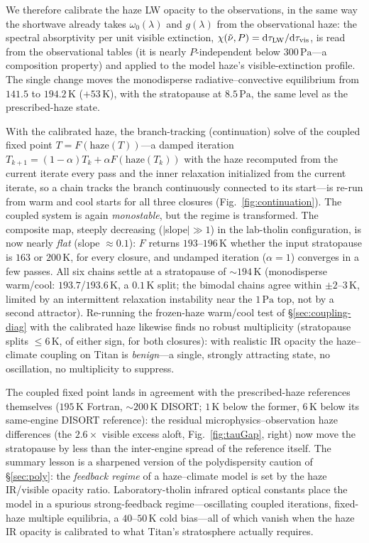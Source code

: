 \documentclass[11pt]{article}
\newcommand{\dd}{\mathrm{d}}
\begin{document}
We therefore calibrate the haze LW opacity to the observations, in the same way
the shortwave already takes $\omega_0(\lambda)$ and $g(\lambda)$ from the
observational haze: the spectral absorptivity per unit visible extinction,
$\chi(\tilde\nu,P)=\dd\tau_{\rm LW}/\dd\tau_{\rm vis}$, is read from the
observational tables (it is nearly $P$-independent below $300\,\mathrm{Pa}$---a
composition property) and applied to the model haze's visible-extinction
profile.  The single change moves the monodisperse radiative--convective
equilibrium from $141.5$ to $194.2\,\mathrm{K}$ ($+53\,\mathrm{K}$), with the
stratopause at $8.5\,\mathrm{Pa}$, the same level as the prescribed-haze state.

With the calibrated haze, the branch-tracking (continuation) solve of the
coupled fixed point $T=F(\mathrm{haze}(T))$---a damped iteration
$T_{k+1}=(1-\alpha)T_k+\alpha F(\mathrm{haze}(T_k))$ with the haze recomputed
from the current iterate every pass and the inner relaxation initialized from
the current iterate, so a chain tracks the branch continuously connected to its
start---is re-run from warm and cool starts for all three closures
(Fig.~\ref{fig:continuation}).  The coupled system is again \emph{monostable},
but the regime is transformed.  The composite map, steeply decreasing
($|$slope$|\gg1$) in the lab-tholin configuration, is now nearly \emph{flat}
(slope $\approx0.1$): $F$ returns $193$--$196\,\mathrm{K}$ whether the input
stratopause is $163$ or $200\,\mathrm{K}$, for every closure, and undamped
iteration ($\alpha=1$) converges in a few passes.  All six chains settle at a
stratopause of $\sim\!194\,\mathrm{K}$ (monodisperse warm/cool:
$193.7$/$193.6\,\mathrm{K}$, a $0.1\,\mathrm{K}$ split; the bimodal chains
agree within $\pm2$--$3\,\mathrm{K}$, limited by an intermittent relaxation
instability near the $1\,\mathrm{Pa}$ top, not by a second attractor).
Re-running the frozen-haze warm/cool test of \S\ref{sec:coupling-diag} with the
calibrated haze likewise finds no robust multiplicity (stratopause splits
$\le6\,\mathrm{K}$, of either sign, for both closures): with realistic IR
opacity the haze--climate coupling on Titan is \emph{benign}---a single,
strongly attracting state, no oscillation, no multiplicity to suppress.

The coupled fixed point lands in agreement with the prescribed-haze
references themselves ($195\,\mathrm{K}$ Fortran, $\sim\!200\,\mathrm{K}$
DISORT; $1\,\mathrm{K}$ below the former, $6\,\mathrm{K}$ below its
same-engine DISORT reference): the residual microphysics--observation haze
differences (the $2.6\times$ visible excess aloft, Fig.~\ref{fig:tauGap},
right) now move the stratopause by less than the inter-engine spread of the
reference itself.  The summary lesson is a
sharpened version of the polydispersity caution of \S\ref{sec:poly}:
the \emph{feedback regime} of a haze--climate model is set by the haze IR/visible
opacity ratio.  Laboratory-tholin infrared optical constants place the model in
a spurious strong-feedback regime---oscillating coupled iterations, fixed-haze
multiple equilibria, a $40$--$50\,\mathrm{K}$ cold bias---all of which vanish
when the haze IR opacity is calibrated to what Titan's stratosphere actually
requires.
\end{document}
